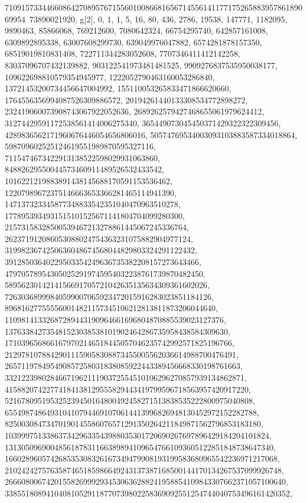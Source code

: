 {{{71091573344660864270895767155601008668165671455614117717526588395786189069954\
73890021920}}, {g[2], {0, 1, 1, 5, 16, 80, 436, 2786, 19538, 147771, 1182095, 
   9890463, 85866068, 769212600, 7080642324, 66754295740, 642857161008, 
   6309892895338, 63007608299730, 639049976047882, 6574281878157350, 
   68519019810831408, 722711344283052608, 7707346411412142258, 
   83037096707432139882, 903122541973481481525, 9909276837535950038177, 
   109622698810579354945977, 1222052790463160053286840, 
   13721453200734456647004992, 155110053265833471866620660, 
   1764556356994087526309886572, 20194261440133308534772898272, 
   232419060073908743067922052636, 2689262579427468655061979624412, 
   31274429591172538561414006275340, 365449073045450371429322322309456, 
   4289836562171960676446054656806016, 50574769534003093103883587334018864, 
   598709602525124619551989870595327116, 
   7115474673422913138522598029931063860, 
   84882629550044573460911489526532433542, 
   1016221219883891438145688170591153536462, 
   12207989672375146663653366281465114941390, 
   147137323345877348833542351040470963510278, 
   1778953934931515101525671141804704099280300, 
   21573158328500539467213278861445067245336764, 
   262371912086053088024754363231075882904977124, 
   3199823674250636048674568044829803324291122432, 
   39128503640229503354249636735382208157273643466, 
   479705789543050252919745954032238761739870482450, 
   5895623014214156691705721042635135634309361602026, 
   72630368999840599007065923472015916283023851184126, 
   896816277555560014821157345106212813811873206044640, 
   11098141332687289443190964661696804870885539023127376, 
   137633842735481523038538101902464286735958438584309630, 
   1710396568661679702146518445057046235742992571825196766, 
   21297810788429011159058308873455005562036614988700476491, 
   265711978495490857258031838085922443389456668330198761663, 
   3321223980284667196211190372554510106296270857939134862871, 
   41588207422774184138129555829443419799596718563957420917220, 
   521678095195325239450164800492458271513838535222800975040808, 
   6554987486493104107944691070614413996826948130452972152282788, 
   82500308473470190145586076571291350264211849871562796853183180, 
   1039997513386373429633543988035301720690267697896429184204101824, 
   13130509690048561878311663898941096547661093605122851848738647340, 
   166028960574268535308326167349479908193199583680965542236971217068, 
   2102424275763587465185986649243137387168500144170134267537099926748, 
   26660800674201558269992934530636288241958854109843307662371057100640, 
   338551808941040810529118770739802258369092551254744040753496161420352, 
}}}
